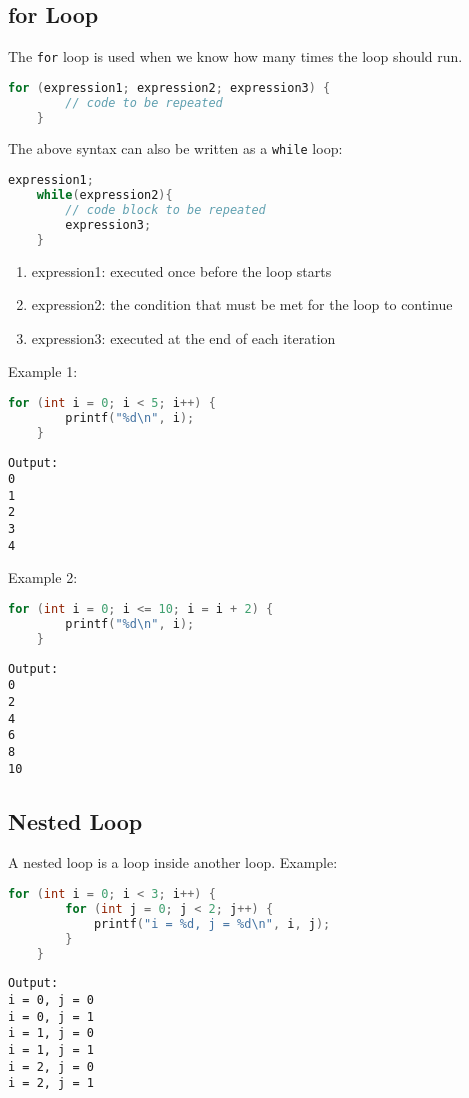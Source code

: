 \subsection{for Loop}

The \verb|for| loop is used when we know how many times the loop should run.

{
\captionsetup[lstlisting]{labelformat=empty, justification=raggedright, singlelinecheck=false}
\begin{lstlisting}[language=c, caption={Syntax}]
	for (expression1; expression2; expression3) {
		// code to be repeated
	}
\end{lstlisting}
}

The above syntax can also be written as a \verb|while| loop:

{
\captionsetup[lstlisting]{labelformat=empty, justification=raggedright, singlelinecheck=false}
\begin{lstlisting}[language=c, caption={Syntax}]
	expression1;
	while(expression2){
		// code block to be repeated
		expression3;
	}
\end{lstlisting}
}

\begin{enumerate}[label={}, leftmargin=*]
	\item expression1: executed once before the loop starts
	\item expression2: the condition that must be met for the loop to continue
	\item expression3: executed at the end of each iteration
\end{enumerate}
Example 1:
\begin{lstlisting}[language=c]
	for (int i = 0; i < 5; i++) {
		printf("%d\n", i);
	}
\end{lstlisting}
\begin{verbatim}
Output:
0
1
2
3
4
\end{verbatim}
Example 2:
\begin{lstlisting}[language=c]
	for (int i = 0; i <= 10; i = i + 2) {
		printf("%d\n", i);
	}
\end{lstlisting}
\begin{verbatim}
Output:
0
2
4
6
8
10
\end{verbatim}

\subsection{Nested Loop}

A nested loop is a loop inside another loop.
Example:
\begin{lstlisting}[language=c]
	for (int i = 0; i < 3; i++) {
		for (int j = 0; j < 2; j++) {
			printf("i = %d, j = %d\n", i, j);
		}
	}
\end{lstlisting}
\begin{verbatim}
Output:
i = 0, j = 0
i = 0, j = 1
i = 1, j = 0
i = 1, j = 1
i = 2, j = 0
i = 2, j = 1
\end{verbatim}

